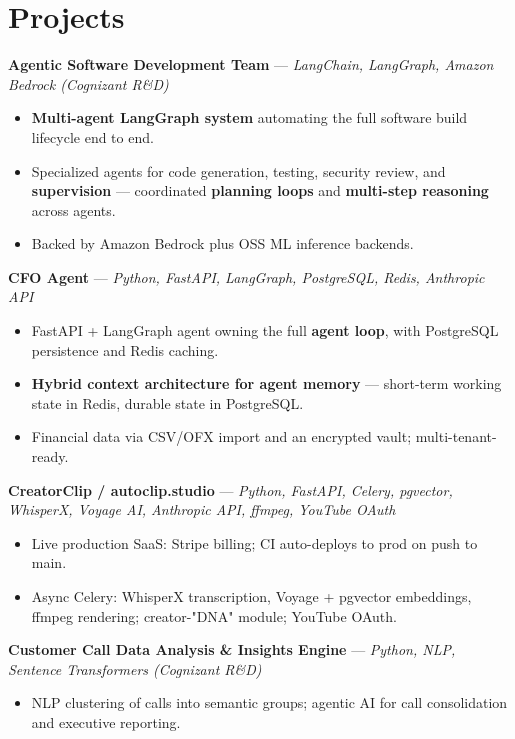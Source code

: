 \documentclass[10pt]{article}
\begin{document}
\section*{Projects}
\noindent \textbf{Agentic Software Development Team} — \textit{LangChain, LangGraph, Amazon Bedrock (Cognizant R\&D)}\par
\begin{itemize}
  \item \textbf{Multi-agent LangGraph system} automating the full software build lifecycle end to end.
  \item Specialized agents for code generation, testing, security review, and \textbf{supervision} — coordinated \textbf{planning loops} and \textbf{multi-step reasoning} across agents.
  \item Backed by Amazon Bedrock plus OSS ML inference backends.
\end{itemize}
\noindent \textbf{CFO Agent} — \textit{Python, FastAPI, LangGraph, PostgreSQL, Redis, Anthropic API}\par
\begin{itemize}
  \item FastAPI + LangGraph agent owning the full \textbf{agent loop}, with PostgreSQL persistence and Redis caching.
  \item \textbf{Hybrid context architecture for agent memory} — short-term working state in Redis, durable state in PostgreSQL.
  \item Financial data via CSV/OFX import and an encrypted vault; multi-tenant-ready.
\end{itemize}
\noindent \textbf{CreatorClip / autoclip.studio} — \textit{Python, FastAPI, Celery, pgvector, WhisperX, Voyage AI, Anthropic API, ffmpeg, YouTube OAuth}\par
\begin{itemize}
  \item Live production SaaS: Stripe billing; CI auto-deploys to prod on push to main.
  \item Async Celery: WhisperX transcription, Voyage + pgvector embeddings, ffmpeg rendering; creator-"DNA" module; YouTube OAuth.
\end{itemize}
\noindent \textbf{Customer Call Data Analysis \& Insights Engine} — \textit{Python, NLP, Sentence Transformers (Cognizant R\&D)}\par
\begin{itemize}
  \item NLP clustering of calls into semantic groups; agentic AI for call consolidation and executive reporting.
\end{itemize}
\end{document}
